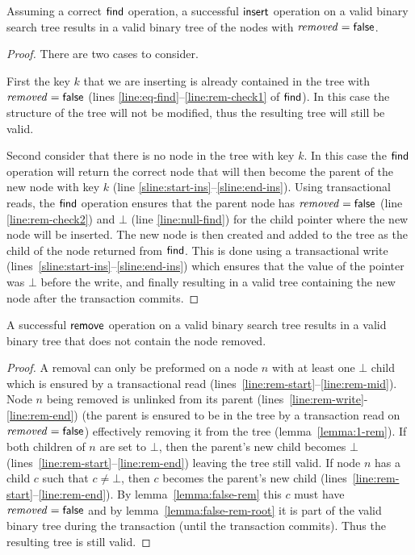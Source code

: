 \begin{lemma}
\label{lemma:insert-valid1}
Assuming a correct $\act{find}$ operation, a successful $\act{insert}$ operation on a valid binary search tree results in a valid binary tree of the nodes with $\ms{removed}=\lit{false}$.
\end{lemma}
\begin{proof}
There are two cases to consider.

First the key $k$ that we are inserting is already contained in the tree with $\ms{removed}=\lit{false}$ (lines \ref{line:eq-find}--\ref{line:rem-check1} of $\act{find}$).
In this case the structure of the tree will not be modified, thus the resulting tree will still be valid.

Second consider that there is no node in the tree with key $k$.
In this case the $\act{find}$ operation will return the correct node that will then become the parent of the new node with key $k$ (line \ref{sline:start-ins}--\ref{sline:end-ins}).
Using transactional reads, the $\act{find}$ operation ensures that the parent node has $\ms{removed}=\lit{false}$ (line \ref{line:rem-check2}) and $\bot$
(line \ref{line:null-find}) for the child pointer where the new
node will be inserted.
The new node is then created and added to the tree as the child of the node returned from $\act{find}$.
This is done using a transactional write (lines~\ref{sline:start-ins}--\ref{sline:end-ins}) which ensures that the value of the pointer was $\bot$ before the write,
and finally resulting in a valid tree containing the new node after the transaction commits.
\end{proof}


\begin{lemma}
\label{lemma:remove-valid}
A successful $\act{remove}$ operation on a valid binary search tree results in a valid binary tree that does not contain the node removed.
\end{lemma}
\begin{proof}
A removal can only be preformed on a node $n$ with at least one $\bot$ child which is ensured by a transactional read (lines~\ref{line:rem-start}--\ref{line:rem-mid}).
Node $n$ being removed is unlinked from its parent (lines~\ref{line:rem-write}-\ref{line:rem-end}) (the parent is ensured to be in the tree by a transaction read on $\ms{removed}=\lit{false}$) effectively removing it from the tree (lemma~\ref{lemma:1-rem}).
If both children of $n$ are set to $\bot$, then the parent's new child becomes $\bot$ (lines~\ref{line:rem-start}--\ref{line:rem-end}) leaving the tree still valid.
If node $n$ has a child $c$ such that $c\neq \bot$, then $c$ becomes the parent's new child 
(lines~\ref{line:rem-start}--\ref{line:rem-end}).
By lemma~\ref{lemma:false-rem} this $c$ must have $\ms{removed}=\lit{false}$ and by lemma~\ref{lemma:false-rem-root} it is part of the valid binary tree during the transaction (until the transaction commits).
Thus the resulting tree is still valid.
\end{proof}

